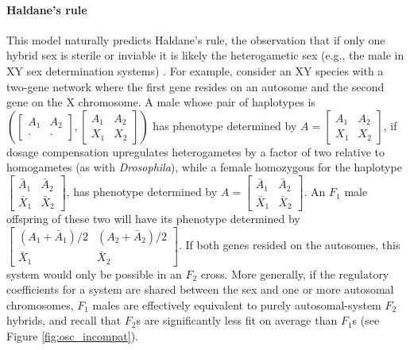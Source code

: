 \documentclass{article}
\newcommand{\1}{\mathbbm{1}}
\begin{document}
\paragraph{Haldane's rule}
This model naturally predicts
Haldane's rule, the observation that if only one hybrid sex is sterile or inviable 
it is likely the heterogametic sex (e.g., the male in XY sex determination systems) \citep{haldane1922sex, orr1997haldane}.
For example, consider an XY species with a two-gene network where the first gene resides on an autosome and the second gene on the X chromosome.
A male whose pair of haplotypes is 
$\left( \left[ \begin{smallmatrix} A_1 & A_2 \\ \cdot & \cdot \end{smallmatrix} \right], \left[ \begin{smallmatrix} A_1 & A_2 \\ X_1 & X_2 \end{smallmatrix} \right] \right)$
has phenotype determined by $A = \left[ \begin{smallmatrix} A_1 & A_2 \\ X_1 & X_2 \end{smallmatrix} \right]$, 
  if dosage compensation upregulates heterogametes by a factor of two relative to homogametes (as with \emph{Drosophila}),
while a female homozygous for the haplotype
$\left[\begin{smallmatrix} \bar A_1 & \bar A_2 \\ \bar X_1 & \bar X_2 \end{smallmatrix}\right]$, has phenotype determined by
$A = \left[\begin{smallmatrix} \bar A_1 & \bar A_2 \\ \bar X_1 & \bar X_2 \end{smallmatrix}\right]$.
An $F_1$ male offspring of these two will have its phenotype determined by
$\left[\begin{smallmatrix} (A_1 + \bar A_1)/2 & (A_2 + \bar A_2)/2 \\ \bar X_1 & \bar X_2 \end{smallmatrix}\right]$.
If both genes resided on the autosomes, this system would only be possible in an $F_2$ cross.
More generally, 
if the regulatory coefficients for a system are shared between the sex and one or more autosomal chromosomes, 
$F_1$ males are effectively equivalent to purely autosomal-system $F_2$ hybrids, and recall that $F_2$s are significantly less fit on average than $F_1$s (see Figure \ref{fig:osc_incompat}).
\end{document}
